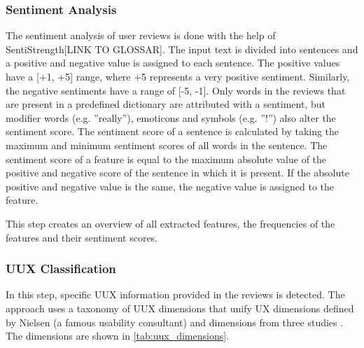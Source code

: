\subsubsection*{Sentiment Analysis}
The sentiment analysis of user reviews is done with the help of SentiStrength[LINK TO GLOSSAR]. The input text is divided into sentences and a positive and negative value is assigned to each sentence. The positive values have a [+1, +5] range, where +5 represents a very positive sentiment. Similarly, the negative sentiments have a range of [-5, -1]. Only words in the reviews that are present in a predefined dictionary are attributed with a sentiment, but modifier words (e.g. ''really''), emoticons and symbols (e.g. ''!'') also alter the sentiment score. The sentiment score of a sentence is calculated by taking the maximum and minimum sentiment scores of all words in the sentence. The sentiment score of a feature is equal to the maximum absolute value of the positive and negative score of the sentence in which it is present. If the absolute positive and negative value is the same, the negative value is assigned to the feature.

This step creates an overview of all extracted features, the frequencies of the features and their sentiment scores.

\subsubsection*{UUX Classification}
In this step, specific UUX information provided in the reviews is detected. The approach uses a taxonomy of UUX dimensions that unify UX dimensions defined by Nielsen (a famous usability consultant) and dimensions from three studies \cite{Bevan2008} \cite{Ketola2008} \cite{BargasAvila2011}. The dimensions are shown in \autoref{tab:uux_dimensions}.

